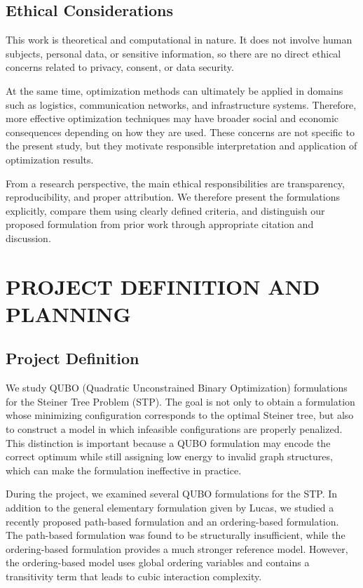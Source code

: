 \documentclass[a4paper,12pt]{report}
\begin{document}
\section{Ethical Considerations}

This work is theoretical and computational in nature. It does not involve human subjects, personal data, or sensitive information, so there are no direct ethical concerns related to privacy, consent, or data security.

At the same time, optimization methods can ultimately be applied in domains such as logistics, communication networks, and infrastructure systems. Therefore, more effective optimization techniques may have broader social and economic consequences depending on how they are used. These concerns are not specific to the present study, but they motivate responsible interpretation and application of optimization results.

From a research perspective, the main ethical responsibilities are transparency, reproducibility, and proper attribution. We therefore present the formulations explicitly, compare them using clearly defined criteria, and distinguish our proposed formulation from prior work through appropriate citation and discussion.

\chapter{PROJECT DEFINITION AND PLANNING}

\section{Project Definition}

We study QUBO (Quadratic Unconstrained Binary Optimization) formulations for the Steiner Tree Problem (STP). The goal is not only to obtain a formulation whose minimizing configuration corresponds to the optimal Steiner tree, but also to construct a model in which infeasible configurations are properly penalized. This distinction is important because a QUBO formulation may encode the correct optimum while still assigning low energy to invalid graph structures, which can make the formulation ineffective in practice.

During the project, we examined several QUBO formulations for the STP. In addition to the general elementary formulation given by Lucas, we studied a recently proposed path-based formulation and an ordering-based formulation. The path-based formulation was found to be structurally insufficient, while the ordering-based formulation provides a much stronger reference model. However, the ordering-based model uses global ordering variables and contains a transitivity term that leads to cubic interaction complexity.
\end{document}
